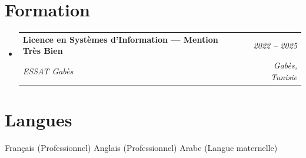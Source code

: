 \documentclass[letterpaper,9pt]{article}
\makeatletter
\newcommand{\resumeSubheading}[4]{
  \vspace{-1pt}\item
  \begin{tabular*}{0.97\textwidth}[t]{l@{\extracolsep{\fill}}r}
    \textbf{#1} & \textit{\color{greytext}#2} \\
    \textit{\small\color{greytext} #3} & \textit{\small\color{greytext} #4}
  \end{tabular*}\vspace{-2pt}
}
\newcommand{\resumeSubHeadingListStart}{\begin{itemize}[leftmargin=0.18in, label={}, itemsep=1.2pt, topsep=2.5pt, parsep=0pt]}
\newcommand{\resumeSubHeadingListEnd}{\end{itemize}\vspace{-2pt}}
\makeatother
\begin{document}
\section{Formation}
\resumeSubHeadingListStart
  \resumeSubheading{Licence en Systèmes d'Information --- Mention Très Bien}{2022 -- 2025}{ESSAT Gabès}{Gabès, Tunisie}
\resumeSubHeadingListEnd\vspace{-1pt}

\section{Langues}
\begin{itemize}[leftmargin=0.18in, label={}, topsep=2pt, itemsep=1pt, parsep=0pt]
\footnotesize{
  \item Français (Professionnel) \textperiodcentered{} Anglais (Professionnel) \textperiodcentered{} Arabe (Langue maternelle)
}
\end{itemize}
\end{document}
